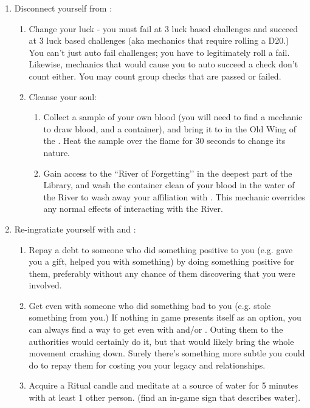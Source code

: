 \documentclass[green]{GL2020}
\begin{document}
\begin{enumerate}
  \item Disconnect yourself from \cGenesis{}:
  \begin{enumerate}
    \item Change your luck - you must fail at 3 luck based challenges and succeed at 3 luck based challenges (aka mechanics that require rolling a D20.) You can’t just auto fail challenges; you have to legitimately roll a fail. Likewise, mechanics that would cause you to auto succeed a check don’t count either. You may count group checks that are passed or failed.
    \item Cleanse your soul:
 	\begin{enumerate}
    \item Collect a sample of your own blood (you will need to find a mechanic to draw blood, and a container), and bring it to \sPFlameTwo{} in the Old Wing of the \pSc{}. Heat the sample over the flame for 30 seconds to change its nature.
    \item Gain access to the ``River of Forgetting’’ in the deepest part of the Library, and wash the container clean of your blood in the water of the River to wash away your affiliation with \cGenesis{}. This mechanic overrides any normal effects of interacting with the River.
  \end{enumerate}
  \end{enumerate}
  
  \item Re-ingratiate yourself with \cEbb{} and \cFlow{}:
  \begin{enumerate}
    \item Repay a debt to someone who did something positive to you (e.g. gave you a gift, helped you with something) by doing something positive for them, preferably without any chance of them discovering that you were involved.
    \item Get even with someone who did something bad to you (e.g. stole something from you.) If nothing in game presents itself as an option, you can always find a way to get even with \cChupLeader{\full} and/or \cChupSecond{\full}. Outing them to the authorities would certainly do it, but that would likely bring the whole movement crashing down. Surely there’s something more subtle you could do to repay them for costing you your legacy and relationships.
    \item Acquire a Ritual candle and meditate at a source of water for 5 minutes with at least 1 other person. (find an in-game sign that describes water).
      \end{enumerate}
  

\end{enumerate}
\end{document}
